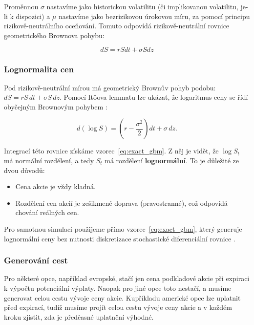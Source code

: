 \documentclass[male,czech,api_bc]{kitheses}
\begin{document}
  Proměnnou $\sigma$ nastavíme jako historickou volatilitu (či implikovanou volatilitu, je-li k dispozici) a $\mu$ nastavíme jako bezrizikovou úrokovou míru, za pomocí principu rizikově-neutrálního oceňování. Tomuto odpovídá rizikově-neutrální rovnice geometrického Brownova pohybu:

  \begin{equation}
    dS = r S dt + \sigma S dz
  \end{equation}

  \subsubsection{Lognormalita cen}

   Pod rizikově-neutrální mírou má geometrický Brownův pohyb podobu: $dS = r S\,dt + \sigma S\,dz$. Pomocí Itôova lemmatu lze ukázat, že logaritmus ceny se řídí obyčejným Brownovým pohybem \parencites{Wilmott2006}:

  \begin{equation}
    d(\log S) = (r - \frac{\sigma^2}{2}) dt + \sigma \, dz.
  \end{equation}

  Integrací této rovnice získáme vzorec~\eqref{eq:exact_gbm}. Z něj je vidět, že $\log S_t$ má normální rozdělení, a tedy $S_t$ má rozdělení \textbf{lognormální}. To je důležité ze dvou důvodů:

  \begin{itemize}
    \item Cena akcie je vždy kladná.
    \item Rozdělení cen akcií je zešikmené doprava (pravostranné), což odpovídá chování reálných cen.
  \end{itemize}

  Pro samotnou simulaci použijeme přímo vzorec~\eqref{eq:exact_gbm}, který generuje lognormální ceny bez nutnosti diskretizace stochastické diferenciální rovnice \parencites[kapitola~24.3]{McDonald2013}[kapitola~80.3]{Wilmott2006}.

  \subsubsection{Generování cest}

  Pro některé opce, například evropské, stačí jen cena podkladové akcie při expiraci k výpočtu potenciální výplaty. Naopak pro jiné opce toto nestačí, a musíme generovat celou cestu vývoje ceny akcie. Kupříkladu americké opce lze uplatnit před expirací, tudíž musíme projít celou cestu vývoje ceny akcie a v každém kroku zjistit, zda je předčasné uplatnění výhodné.
\end{document}
